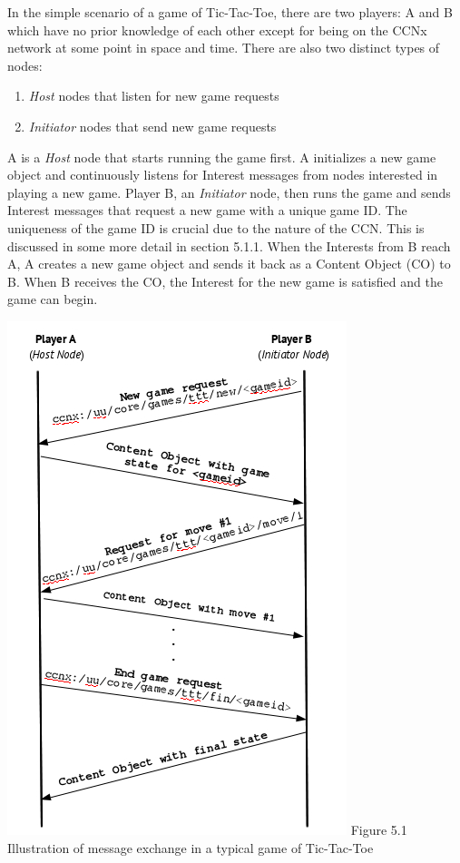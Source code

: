 \documentclass[a4paper,12pt]{report}      %
\begin{document}
In the simple scenario of a game of Tic-Tac-Toe, there are two players: A and B which have no prior
knowledge of each other except for being on the CCNx network at some point in space and time. There
are also two distinct types of nodes: 
\begin{enumerate}
\item \emph{Host} nodes that listen for new game requests
\item \emph{Initiator} nodes that send new game requests 
\end{enumerate}

A is a \emph{Host} node that starts running the game first. A initializes a new game object and continuously
 listens for Interest messages from nodes interested in playing a new game. Player B, an \emph{Initiator} node, 
then runs the game and sends Interest messages that request a new game with a unique game ID. The uniqueness of the game ID is
crucial due to the nature of the CCN. This is discussed in some more detail in section 5.1.1. When the
Interests from B reach A, A creates a new game object and sends it back as a Content Object (CO)
to B. When B receives the CO, the Interest for the new game is satisfied and the game can begin.

\begin{center}\includegraphics[scale=0.85]{dtgp_msgx.jpg}\newline
Figure 5.1 Illustration of message exchange in a typical game of Tic-Tac-Toe
\end{center}
\end{document}

